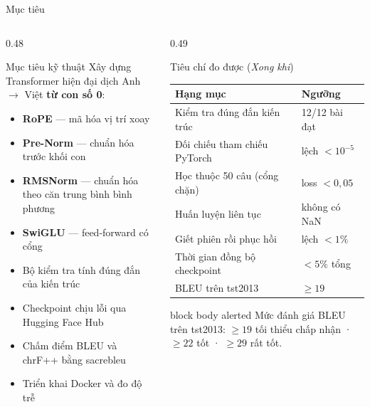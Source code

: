 \documentclass[aspectratio=169, 10pt]{beamer}
\newcommand{\bangchat}{\setlength{\tabcolsep}{3pt}}
\begin{document}
\begin{frame}[shrink=10]{Mục tiêu}
  \begin{columns}[T]
    \begin{column}{0.48\textwidth}
      \begin{block}{Mục tiêu kỹ thuật}
        Xây dựng Transformer hiện đại dịch Anh $\rightarrow$ Việt \textbf{từ con số 0}:
        \begin{itemize}
          \setlength{\itemsep}{0.15em}
          \item \textbf{RoPE} — mã hóa vị trí xoay
          \item \textbf{Pre-Norm} — chuẩn hóa trước khối con
          \item \textbf{RMSNorm} — chuẩn hóa theo căn trung bình bình phương
          \item \textbf{SwiGLU} — feed-forward có cổng
          \item Bộ kiểm tra tính đúng đắn của kiến trúc
          \item Checkpoint chịu lỗi qua Hugging Face Hub
          \item Chấm điểm BLEU và chrF++ bằng sacrebleu
          \item Triển khai Docker và đo độ trễ
        \end{itemize}
      \end{block}
    \end{column}
    \begin{column}{0.49\textwidth}
      \begin{block}{Tiêu chí đo được (\textit{Xong khi})}
        \scriptsize\bangchat
        \begin{tabular}{@{}p{4.0cm}p{2.1cm}@{}}
          \toprule
          \textbf{Hạng mục} & \textbf{Ngưỡng} \\
          \midrule
          Kiểm tra đúng đắn kiến trúc  & 12/12 bài đạt \\
          Đối chiếu tham chiếu PyTorch & lệch $< 10^{-5}$ \\
          Học thuộc 50 câu (cổng chặn) & loss $< 0{,}05$ \\
          Huấn luyện liên tục          & không có NaN \\
          Giết phiên rồi phục hồi      & lệch $< 1\%$ \\
          Thời gian đồng bộ checkpoint & $< 5\%$ tổng \\
          BLEU trên tst2013            & $\ge 19$ \\
          \bottomrule
        \end{tabular}
      \end{block}
      \begin{beamercolorbox}[wd=\textwidth, rounded=true, sep=6pt]{block body alerted}
        {\color{MLIOTink}\footnotesize Mức đánh giá BLEU trên tst2013:
        $\ge 19$ tối thiểu chấp nhận · $\ge 22$ tốt · $\ge 29$ rất tốt.}
      \end{beamercolorbox}
    \end{column}
  \end{columns}
\end{frame}
\end{document}
